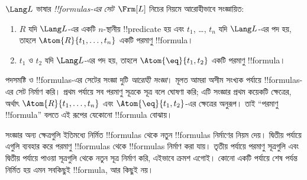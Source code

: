 \documentclass[../../../include/open-logic-section]{subfiles}
\begin{document}
\begin{defn}[সূত্র]
$\Lang L$ ভাষার \emph{!!{formula}s-এর সেট}~$\Frm[L]$ নিচের নিয়মে
আরোহীভাবে সংজ্ঞায়িত:
\begin{enumerate}


\item $R$ যদি $\Lang L$-এর একটি $n$-স্থানীয় !!{predicate} হয় এবং
  $t_1$, \dots, $t_n$ যদি $\Lang L$-এর পদ হয়, তাহলে
  $\Atom{R}{t_1,\ldots, t_n}$ একটি পরমাণু !!{formula}।

\item $t_1$ ও $t_2$ যদি $\Lang L$-এর পদ হয়, তাহলে
  $\Atom{\eq}{t_1, t_2}$ একটি পরমাণু !!{formula}।








\end{enumerate}
\end{defn}

\begin{explain}
পদসমষ্টি ও !!{formula}s-এর সেটের সংজ্ঞা দুটি \emph{আরোহী সংজ্ঞা}।
মূলত আমরা অসীম সংখ্যক পর্যায়ে !!{formula}s-এর সেট নির্মাণ করি। প্রথম
পর্যায়ে সব পরমাণু সূত্রকে সূত্র বলে ঘোষণা করি; এটি সংজ্ঞার প্রথম কয়েকটি
ক্ষেত্রের, অর্থাৎ
%
%
$\Atom{R}{t_1,\dots,t_n}$ এবং $\Atom{\eq}{t_1,t_2}$-এর ক্ষেত্রের
অনুরূপ। তাই “পরমাণু !!{formula}” বলতে এই রূপের যেকোনো !!{formula}
বোঝায়।

সংজ্ঞার অন্য ক্ষেত্রগুলি ইতিমধ্যে নির্মিত !!{formula}s থেকে নতুন
!!{formula}s নির্মাণের নিয়ম দেয়। দ্বিতীয় পর্যায়ে এগুলি ব্যবহার করে
পরমাণু !!{formula}s থেকে !!{formula}s নির্মাণ করা যায়। তৃতীয় পর্যায়ে
পরমাণু সূত্রগুলি এবং দ্বিতীয় পর্যায়ে পাওয়া সূত্রগুলি থেকে নতুন সূত্র
নির্মাণ করি, এইভাবে ক্রমশ এগোই। কোনো একটি পর্যায়ে শেষ পর্যন্ত নির্মিত
হয় এমন সবকিছুই !!{formula}, আর কিছুই নয়।
\end{explain}
\end{document}
